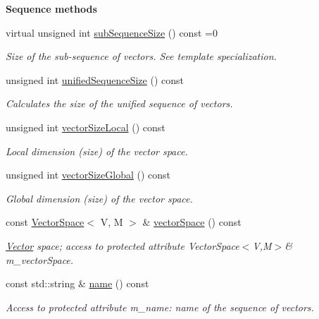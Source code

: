 \begin{Indent}{\bf Sequence methods}\par
\begin{DoxyCompactItemize}
\item 
virtual unsigned int \hyperlink{class_q_u_e_s_o_1_1_base_vector_sequence_afd6278702d40bdf1044697bbd6ad1957}{sub\-Sequence\-Size} () const =0
\begin{DoxyCompactList}\small\item\em Size of the sub-\/sequence of vectors. See template specialization. \end{DoxyCompactList}\item 
unsigned int \hyperlink{class_q_u_e_s_o_1_1_base_vector_sequence_a188dc4632db5b93c01e8bc69bf631f4a}{unified\-Sequence\-Size} () const 
\begin{DoxyCompactList}\small\item\em Calculates the size of the unified sequence of vectors. \end{DoxyCompactList}\item 
unsigned int \hyperlink{class_q_u_e_s_o_1_1_base_vector_sequence_a2fefedf9e5b90f22881103b3f92555f6}{vector\-Size\-Local} () const 
\begin{DoxyCompactList}\small\item\em Local dimension (size) of the vector space. \end{DoxyCompactList}\item 
unsigned int \hyperlink{class_q_u_e_s_o_1_1_base_vector_sequence_aac107ca7ba8ce666f8f994e8bbe922a8}{vector\-Size\-Global} () const 
\begin{DoxyCompactList}\small\item\em Global dimension (size) of the vector space. \end{DoxyCompactList}\item 
const \hyperlink{class_q_u_e_s_o_1_1_vector_space}{Vector\-Space}$<$ V, M $>$ \& \hyperlink{class_q_u_e_s_o_1_1_base_vector_sequence_af9a4dd979a2fa8dee85bb07793b59ba2}{vector\-Space} () const 
\begin{DoxyCompactList}\small\item\em \hyperlink{class_q_u_e_s_o_1_1_vector}{Vector} space; access to protected attribute Vector\-Space$<$\-V,\-M$>$\& m\-\_\-vector\-Space. \end{DoxyCompactList}\item 
const std\-::string \& \hyperlink{class_q_u_e_s_o_1_1_base_vector_sequence_a48f6fe02cf77f4233d3bcdfef3870f19}{name} () const 
\begin{DoxyCompactList}\small\item\em Access to protected attribute {\ttfamily m\-\_\-name\-:} name of the sequence of vectors. \end{DoxyCompactList}\item 

\end{DoxyCompactItemize}
\end{Indent}
